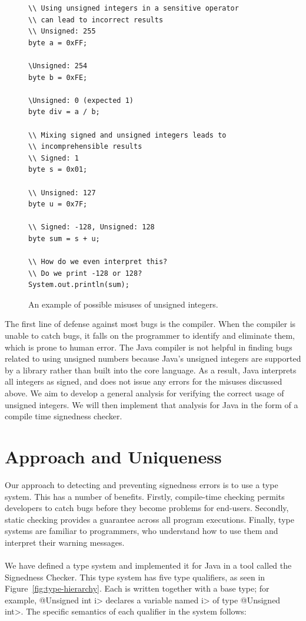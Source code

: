 \begin{figure}[t]
\begin{lstlisting}
\\ Using unsigned integers in a sensitive operator
\\ can lead to incorrect results
\\ Unsigned: 255
byte a = 0xFF;

\Unsigned: 254
byte b = 0xFE;

\Unsigned: 0 (expected 1)
byte div = a / b;

\\ Mixing signed and unsigned integers leads to
\\ incomprehensible results
\\ Signed: 1
byte s = 0x01;

\\ Unsigned: 127
byte u = 0x7F;

\\ Signed: -128, Unsigned: 128
byte sum = s + u;

\\ How do we even interpret this?
\\ Do we print -128 or 128?
System.out.println(sum);
\end{lstlisting}
\caption{An example of possible misuses of unsigned integers.}
\label{fig:misuse}
\end{figure}

The first line of defense against most bugs is the compiler. When the
compiler is unable to catch bugs, it falls on the programmer to identify and
eliminate them, which is prone to human error. The Java compiler
is not helpful in finding bugs related to using unsigned
numbers because Java's unsigned
integers are supported by a library rather than built into the core language.
As a result, Java interprets all integers as signed, and does not issue any
errors for the misuses discussed above. We aim to develop a general analysis
for verifying the correct usage of unsigned integers. We will then implement
that analysis for Java in the form of a compile time signedness checker.

\newpage
\section{Approach and Uniqueness} \label{app}

Our approach to detecting and preventing signedness errors is to use a type
system. This has a number of benefits. Firstly, compile-time checking permits
developers
to catch bugs before they become problems for end-users. Secondly, static
checking provides a guarantee across all program executions.
Finally, type systems are familiar to programmers,
who understand how to use them
and interpret their warning messages.\\
\\
We have defined a type system and implemented it for Java in a tool
called the Signedness Checker.
This type system has five type qualifiers, as seen in
Figure~\ref{fig:type-hierarchy}.  Each is written together
with a base type; for example, \<@Unsigned int i> declares a
variable named \<i> of type \<@Unsigned int>. The specific semantics of
each qualifier in the system follows:

